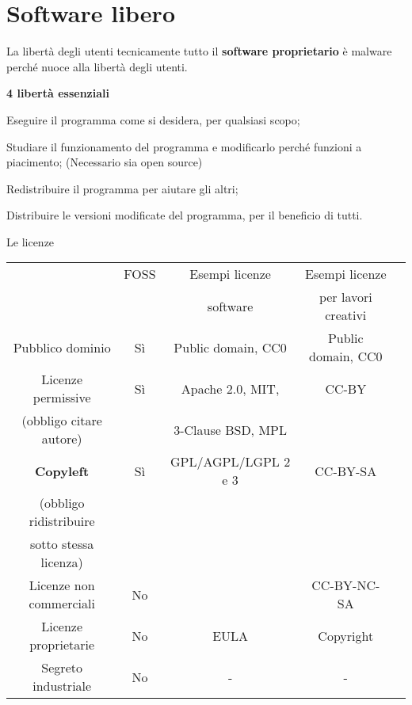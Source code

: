 
\section{Software libero}

\begin{myframe}{La libertà degli utenti}
  tecnicamente tutto il \textbf{software proprietario} è malware\\perché nuoce alla libertà degli utenti.

  \pause\bigskip

  {\Large\textbf{4 libertà essenziali}}
  \pause
   \begin{description}[<+->]
     \item[Libertà 0] Eseguire il programma come si desidera, per qualsiasi scopo;
     \item[Libertà 1] Studiare il funzionamento del programma e modificarlo perché funzioni a piacimento; (Necessario sia open source)
     \item[Libertà 2] Redistribuire il programma per aiutare gli altri;
     \item[Libertà 3] Distribuire le versioni modificate del programma, per il beneficio di tutti.
   \end{description}
\end{myframe}

\begin{myframe}{Le licenze}%
  \begin{tabular}{c|cccc}
    & FOSS & Esempi licenze & Esempi licenze\\
    & & software & per lavori creativi\\\hline
    Pubblico dominio & Sì & Public domain, CC0 & Public domain, CC0\\\hline
    Licenze permissive &  Sì & Apache 2.0, MIT, & CC-BY\\
    (obbligo citare autore)&  & 3-Clause BSD, MPL\\\hline
    \textbf{Copyleft} & Sì & GPL/AGPL/LGPL 2 e 3 & CC-BY-SA\\
    (obbligo ridistribuire\\sotto stessa licenza)\\\hline
    Licenze non commerciali & No & & CC-BY-NC-SA\\\hline
    Licenze proprietarie & No & EULA & Copyright \\\hline
    Segreto industriale & No & - & -
  \end{tabular}
\end{myframe}

